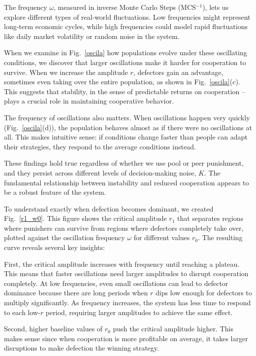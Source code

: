 The frequency $\omega$, measured in inverse Monte Carlo Steps (MCS$^{-1}$), lets us explore different types of real-world fluctuations. Low frequencies might represent long-term economic cycles, while high frequencies could model rapid fluctuations like daily market volatility or random noise in the system.

When we examine in Fig.~\ref{oscila} how populations evolve under these oscillating conditions, we discover that larger oscillations make it harder for cooperation to survive. When we increase the amplitude $r$, defectors gain an advantage, sometimes even taking over the entire population, as shown in Fig.~\ref{oscila}(c). This suggests that stability, in the sense of predictable returns on cooperation – plays a crucial role in maintaining cooperative behavior.

The frequency of oscillations also matters. When oscillations happen very quickly (Fig.~\ref{oscila}(d)), the population behaves almost as if there were no oscillations at all. This makes intuitive sense: if conditions change faster than people can adapt their strategies, they respond to the average conditions instead.

These findings hold true regardless of whether we use pool or peer punishment, and they persist across different levels of decision-making noise, $K$. The fundamental relationship between instability and reduced cooperation appears to be a robust feature of the system.

To understand exactly when defection becomes dominant, we created Fig.~\ref{r1_w0}. This figure shows the critical amplitude $r_1$ that separates regions where punishers can survive from regions where defectors completely take over, plotted against the oscillation frequency $\omega$ for different values $r_0$. The resulting curve reveals several key insights:

First, the critical amplitude increases with frequency until reaching a plateau. This means that faster oscillations need larger amplitudes to disrupt cooperation completely. At low frequencies, even small oscillations can lead to defector dominance because there are long periods when $r$ dips low enough for defectors to multiply significantly. As frequency increases, the system has less time to respond to each low-$r$ period, requiring larger amplitudes to achieve the same effect.

Second, higher baseline values of $r_0$ push the critical amplitude higher. This makes sense since when cooperation is more profitable on average, it takes larger disruptions to make defection the winning strategy.

